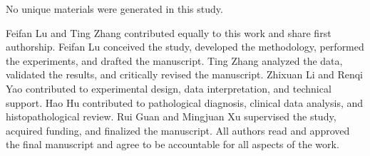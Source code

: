 \documentclass[pdflatex,sn-vancouver-num]{sn-jnl}
\begin{document}
No unique materials were generated in this study.

Feifan Lu and Ting Zhang contributed equally to this work and share first authorship. Feifan Lu conceived the study, developed the methodology, performed the experiments, and drafted the manuscript. Ting Zhang analyzed the data, validated the results, and critically revised the manuscript. Zhixuan Li and Renqi Yao contributed to experimental design, data interpretation, and technical support. Hao Hu contributed to pathological diagnosis, clinical data analysis, and histopathological review. Rui Guan and Mingjuan Xu supervised the study, acquired funding, and finalized the manuscript. All authors read and approved the final manuscript and agree to be accountable for all aspects of the work.



\end{document}
